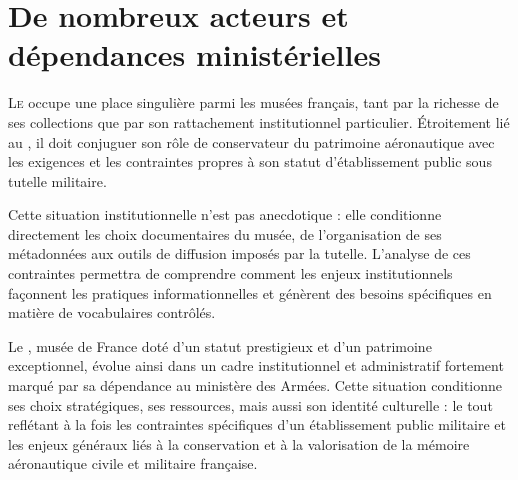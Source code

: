 \chapter[Acteurs et dépendances]{\label{I-B}De nombreux acteurs et dépendances ministérielles }


\lettrine{L}e \maelong occupe une place singulière parmi les musées français, tant par la richesse de ses collections que par son rattachement institutionnel particulier. Étroitement lié au \minarm, il doit conjuguer son rôle de conservateur du patrimoine aéronautique avec les exigences et les contraintes propres à son statut d’établissement public sous tutelle militaire.

Cette situation institutionnelle n'est pas anecdotique : elle conditionne directement les choix documentaires du musée, de l'organisation de ses métadonnées aux outils de diffusion imposés par la tutelle. L'analyse de ces contraintes permettra de comprendre comment les enjeux institutionnels façonnent les pratiques informationnelles et génèrent des besoins spécifiques en matière de vocabulaires contrôlés.





\bigskip
\bigskip
\bigskip

Le \maelong, musée de France doté d’un statut prestigieux et d’un patrimoine exceptionnel, évolue ainsi dans un cadre institutionnel et administratif fortement marqué par sa dépendance au ministère des Armées. Cette situation conditionne ses choix stratégiques, ses ressources, mais aussi son identité culturelle : le tout reflétant à la fois les contraintes spécifiques d’un établissement public militaire et les enjeux généraux liés à la conservation et à la valorisation de la mémoire aéronautique civile et militaire française. 

\bigskip
\bigskip
\bigskip